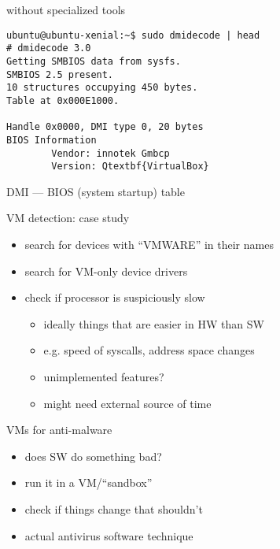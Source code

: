 \begin{frame}[fragile,label=woTools]{without specialized tools}
\begin{Verbatim}[fontsize=\small,commandchars=Q\{\}]
ubuntu@ubuntu-xenial:~$ sudo dmidecode | head
# dmidecode 3.0
Getting SMBIOS data from sysfs.
SMBIOS 2.5 present.
10 structures occupying 450 bytes.
Table at 0x000E1000.

Handle 0x0000, DMI type 0, 20 bytes
BIOS Information
        Vendor: innotek Gmbcp 
        Version: Qtextbf{VirtualBox}
\end{Verbatim}
{\small DMI --- BIOS (system startup) table}
\end{frame}

\begin{frame}{VM detection: case study}
\begin{itemize}
    \item search for devices with ``VMWARE'' in their names
    \item search for VM-only device drivers
    \item check if processor is suspiciously slow
        \begin{itemize}
        \item ideally things that are easier in HW than SW
        \item e.g. speed of syscalls, address space changes
        \item unimplemented features?
        \item might need external source of time
        \end{itemize}
\end{itemize}
\end{frame}

\begin{frame}{VMs for anti-malware} 
\begin{itemize}
    \item does SW do something bad?
    \item run it in a VM/``sandbox''
    \item check if things change that shouldn't
    \item actual antivirus software technique
\end{itemize}
\end{frame}

